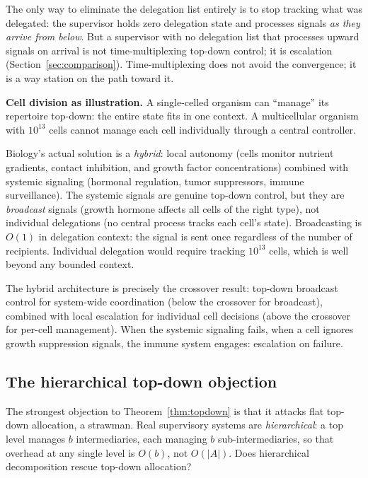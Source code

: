 \documentclass[11pt]{article}
\theoremstyle{definition}
\begin{document}
The only way to eliminate the delegation list entirely is to stop
tracking what was delegated: the supervisor holds zero delegation state
and processes signals \emph{as they arrive from below}. But a
supervisor with no delegation list that processes upward signals on
arrival is not time-multiplexing top-down control; it is escalation
(Section~\ref{sec:comparison}). Time-multiplexing does not
avoid the convergence; it is a way station on the path toward it.

\textbf{Cell division as illustration.} A single-celled organism can
``manage'' its repertoire top-down: the entire state fits in one
context. A multicellular organism with $10^{13}$ cells cannot manage
each cell individually through a central controller.

Biology's actual solution is a \emph{hybrid}: local autonomy (cells
monitor nutrient gradients, contact inhibition, and growth factor
concentrations) combined with systemic signaling (hormonal regulation,
tumor suppressors, immune surveillance). The systemic signals are
genuine top-down control, but they are \emph{broadcast} signals
(growth hormone affects all cells of the right type), not individual
delegations (no central process tracks each cell's state). Broadcasting
is $O(1)$ in delegation context: the signal is sent once regardless of
the number of recipients. Individual delegation would require tracking
$10^{13}$ cells, which is well beyond any bounded context.

The hybrid architecture is precisely the crossover result: top-down
broadcast control for system-wide coordination (below the crossover for
broadcast), combined with local escalation for individual cell
decisions (above the crossover for per-cell management). When the
systemic signaling fails, when a cell ignores growth suppression
signals, the immune system engages: escalation on failure.

\subsection{The hierarchical top-down objection}

The strongest objection to Theorem~\ref{thm:topdown} is that it attacks
flat top-down allocation, a strawman. Real supervisory systems are
\emph{hierarchical}: a top level manages $b$ intermediaries, each
managing $b$ sub-intermediaries, so that overhead at any single level is
$O(b)$, not $O(|A|)$. Does hierarchical decomposition rescue top-down
allocation?
\end{document}
